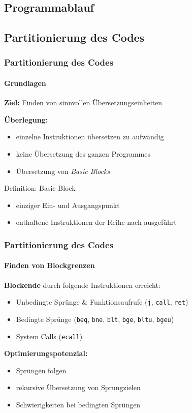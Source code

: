 \subsection{Programmablauf} %

\subsection{Partitionierung des Codes} %
\begin{frame}
	\frametitle{Partitionierung des Codes}
	\framesubtitle{Grundlagen}
	\textbf{Ziel:} Finden von sinnvollen Übersetzungseinheiten
	
	\vspace{0.50cm}
	
	\textbf{Überlegung:}
	\begin{itemize}
		\item einzelne Instruktionen übersetzen zu aufwändig
		\item keine Übersetzung des ganzen Programmes
		\item[\conclude] Übersetzung von \textit{Basic Blocks}
	\end{itemize}
	
	\vspace{0.50cm}
	
	\begin{block}{Definition: Basic Block}
		\begin{itemize}
			\item einziger Ein- und Ausgangspunkt
			\item enthaltene Instruktionen der Reihe nach ausgeführt
		\end{itemize}
	\end{block}
\end{frame}

\begin{frame}
	\frametitle{Partitionierung des Codes}
	\framesubtitle{Finden von Blockgrenzen}
	
	\textbf{Blockende} durch folgende Instruktionen erreicht:
	\begin{itemize}
		\item Unbedingte Sprünge \& Funktionsaufrufe (\texttt{j}, \texttt{call}, \texttt{ret}) %
		\item Bedingte Sprünge (\texttt{beq}, \texttt{bne}, \texttt{blt}, \texttt{bge}, \texttt{bltu}, \texttt{bgeu})
		\item System Calls (\texttt{ecall})
	\end{itemize}
	
	\vspace{0.50cm}
	
	\textbf{Optimierungspotenzial:}
	\begin{itemize}
		\item Sprüngen folgen
		\item rekursive Übersetzung von Sprungzielen
		\item Schwierigkeiten bei bedingten Sprüngen
	\end{itemize}
	
\end{frame}

